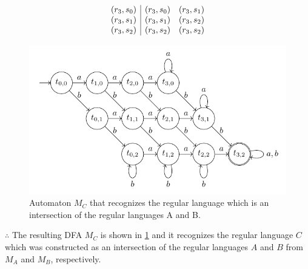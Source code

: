 \begin{solution}
\begin{multicols}{2}
\begin{equation*}
\begin{array}{c | c c}
                (r_3, s_0) & (r_3, s_0) & (r_3, s_1) \\
                (r_3, s_1) & (r_3, s_1) & (r_3, s_2) \\
                (r_3, s_2) & (r_3, s_2) & (r_3, s_2) \\
            \end{array}
        \end{equation*}
        \columnbreak
        \begin{figure}[H]
            \centering
            \includegraphics[scale=0.85]{automaton_c}
            \caption{Automaton $M_C$ that recognizes the regular language which is an intersection of the regular languages A and B.}
            \label{fig:automaton_c}
        \end{figure}
    \end{multicols}
    $\therefore$ The resulting DFA $M_C$ is shown in \cref{fig:automaton_c} and it recognizes the regular language $C$ which was constructed as an intersection of the regular languages $A$ and $B$ from $M_A$ and $M_B$, respectively.
\end{solution}
